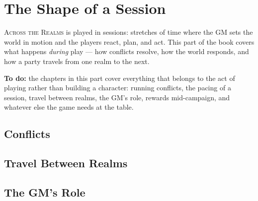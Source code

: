 \chapter{The Shape of a Session}
\begin{readaloud}
\lipsum[25][1-3]
\end{readaloud}

\lettrine{A}{cross the Realms} is played in sessions: stretches of time
where the GM sets the world in motion and the players react, plan, and
act. This part of the book covers what happens \emph{during} play ---
how conflicts resolve, how the world responds, and how a party travels
from one realm to the next.

\begin{notebox}
\textbf{To do:} the chapters in this part cover everything that belongs
to the act of playing rather than building a character: running conflicts,
the pacing of a session, travel between realms, the GM's role, rewards
mid-campaign, and whatever else the game needs at the table.
\end{notebox}

\section{Conflicts}
\lipsum[26][1-5]

\section{Travel Between Realms}
\lipsum[27][1-4]

\section{The GM's Role}
\lipsum[28][1-4]
